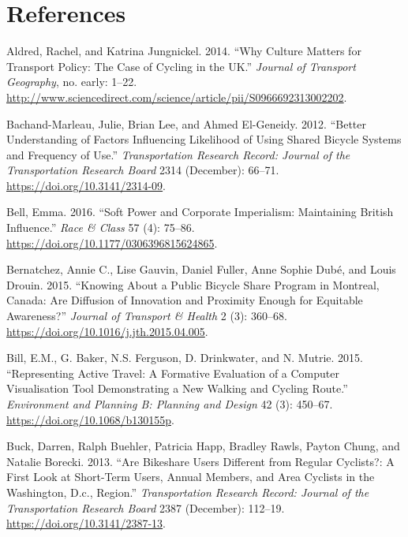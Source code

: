 \documentclass[]{article}
\begin{document}
\hypertarget{references}{%
\section*{References}\label{references}}

\hypertarget{refs}{}
\leavevmode\hypertarget{ref-aldred_why_2014}{}%
Aldred, Rachel, and Katrina Jungnickel. 2014. ``Why Culture Matters for Transport Policy: The Case of Cycling in the UK.'' \emph{Journal of Transport Geography}, no. early: 1--22. \url{http://www.sciencedirect.com/science/article/pii/S0966692313002202}.

\leavevmode\hypertarget{ref-bachand-marleau_better_2012}{}%
Bachand-Marleau, Julie, Brian Lee, and Ahmed El-Geneidy. 2012. ``Better Understanding of Factors Influencing Likelihood of Using Shared Bicycle Systems and Frequency of Use.'' \emph{Transportation Research Record: Journal of the Transportation Research Board} 2314 (December): 66--71. \url{https://doi.org/10.3141/2314-09}.

\leavevmode\hypertarget{ref-bell_soft_2016}{}%
Bell, Emma. 2016. ``Soft Power and Corporate Imperialism: Maintaining British Influence.'' \emph{Race \& Class} 57 (4): 75--86. \url{https://doi.org/10.1177/0306396815624865}.

\leavevmode\hypertarget{ref-bernatchez_knowing_2015}{}%
Bernatchez, Annie C., Lise Gauvin, Daniel Fuller, Anne Sophie Dubé, and Louis Drouin. 2015. ``Knowing About a Public Bicycle Share Program in Montreal, Canada: Are Diffusion of Innovation and Proximity Enough for Equitable Awareness?'' \emph{Journal of Transport \& Health} 2 (3): 360--68. \url{https://doi.org/10.1016/j.jth.2015.04.005}.

\leavevmode\hypertarget{ref-bill_representing_2015}{}%
Bill, E.M., G. Baker, N.S. Ferguson, D. Drinkwater, and N. Mutrie. 2015. ``Representing Active Travel: A Formative Evaluation of a Computer Visualisation Tool Demonstrating a New Walking and Cycling Route.'' \emph{Environment and Planning B: Planning and Design} 42 (3): 450--67. \url{https://doi.org/10.1068/b130155p}.

\leavevmode\hypertarget{ref-buck_are_2013}{}%
Buck, Darren, Ralph Buehler, Patricia Happ, Bradley Rawls, Payton Chung, and Natalie Borecki. 2013. ``Are Bikeshare Users Different from Regular Cyclists?: A First Look at Short-Term Users, Annual Members, and Area Cyclists in the Washington, D.c., Region.'' \emph{Transportation Research Record: Journal of the Transportation Research Board} 2387 (December): 112--19. \url{https://doi.org/10.3141/2387-13}.
\end{document}
